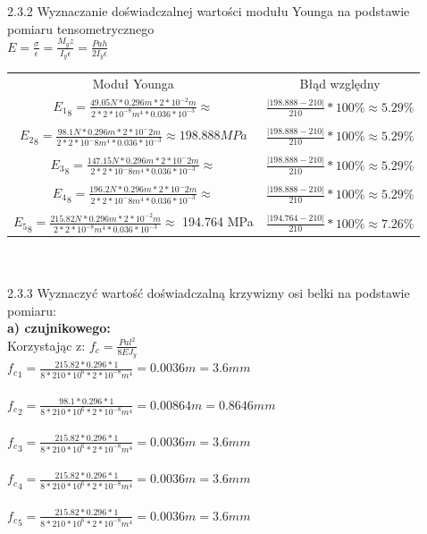 \documentclass[11pt]{article}
\begin{document}
2.3.2
Wyznaczanie doświadczalnej wartości modułu Younga na podstawie pomiaru tensometrycznego\\
$E = \frac{\sigma}{\epsilon} = \frac{M_gz}{I_y\epsilon} = \frac{Pah}{2I_y\epsilon}$\\
\begin{tabular}{cc}
Moduł Younga & Błąd względny\\
${E_1}_8 = \frac{49.05 N * 0.296 m * 2 * 10^{-2} m}{2 * 2 * 10^{-8} m^4 * 0.036 * 10^{-3}} \approx $ & $\frac{|198.888-210|}{210} * 100\% \approx 5.29\%$\\\\
${E_2}_8 = \frac{98.1 N * 0.296 m * 2 * 10^-2 m}{2 * 2 * 10^-8 m^4 * 0.036 * 10^{-3}} \approx 198.888 MPa$& $\frac{|198.888-210|}{210} * 100\% \approx 5.29\%$\\\\
${E_3}_8 = \frac{147.15 N * 0.296 m * 2 * 10^-2 m}{2 * 2 * 10^-8 m^4 * 0.036 * 10^{-3}} \approx $ & $\frac{|198.888-210|}{210} * 100\% \approx 5.29\%$\\\\
${E_4}_8 = \frac{196.2 N * 0.296 m * 2 * 10^-2 m}{2 * 2 * 10^-8 m^4 * 0.036 * 10^{-3}} \approx $ & $\frac{|198.888-210|}{210} * 100\% \approx 5.29\%$\\\\
${E_5}_8 = \frac{215.82 N * 0.296 m * 2 * 10^{-2} m}{2 * 2 * 10^{-8} m^4 * 0.036 * 10^{-3}} \approx $ 194.764 MPa & $\frac{|194.764-210|}{210} * 100\% \approx 7.26\%$\\
\end{tabular}\\\\

2.3.3
Wyznaczyć wartość doświadczalną krzywizny osi belki na podstawie pomiaru:\\
\textbf{a) czujnikowego:}\\
Korzystając z: $f_c = \frac{Pal^2}{8EJ_y}$\\
${f_c}_1 =\frac{215.82*0.296*1}{8*210*10^6*2*10^{-8}m^4}=0.0036m=3.6mm$\\\\
${f_c}_2 =\frac{98.1*0.296*1}{8*210*10^6*2*10^{-8}m^4}=0.00864m=0.8646mm$\\\\
${f_c}_3 =\frac{215.82*0.296*1}{8*210*10^6*2*10^{-8}m^4}=0.0036m=3.6mm$\\\\
${f_c}_4 =\frac{215.82*0.296*1}{8*210*10^6*2*10^{-8}m^4}=0.0036m=3.6mm$\\\\
${f_c}_5 =\frac{215.82*0.296*1}{8*210*10^6*2*10^{-8}m^4}=0.0036m=3.6mm$\\
\end{document}
